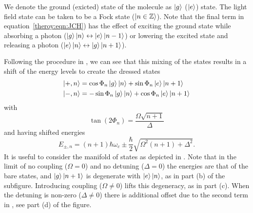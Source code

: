 We denote the ground (exicted) state of the molecule as $\ket{g}$ ($\ket{e}$)
state. The light field state can be taken to be a Fock state ($\ket{n \in
\mathbb{Z}}$). Note that the final term in equation~\ref{theroy:eqn:JCH}) has
the effect of exciting the ground state while absorbing a photon
($\ket{g}\ket{n} \leftrightarrow \ket{e}\ket{n-1}$) or lowering the excited state
and releasing a photon ($\ket{e}\ket{n} \leftrightarrow \ket{g}\ket{n+1}$).

Following the procedure in , we can see that this
mixing of the states results in a shift of the energy levels to create the
dressed states
%
\begin{align}
  \ket{+, n} &= \cos\Phi_n \ket{g}\ket{n} + \sin\Phi_n \ket{e}\ket{n+1} \\
  \ket{-, n} &= -\sin\Phi_n \ket{g}\ket{n} + \cos\Phi_n \ket{e}\ket{n+1}
\end{align}
%
with
%
\begin{equation}
  \tan(2\Phi_n) = \frac{\Omega\sqrt{n+1}}{\Delta}
\end{equation}
%
and having shifted energies
%
\begin{equation}
  E_{\pm, n} = (n+1)\hbar\omega_c \pm \frac{\hbar}{2}\sqrt{\Omega^2(n+1) +
  \Delta^2}.
  \label{theory:eqn:JCHenergies}
\end{equation}
%
It is useful to consider the manifold of states as depicted in
.  Note that in the limit of no coupling
($\Omega = 0$) and no detuning ($\Delta = 0$) the energies are that of the bare
states, and $\ket{g}\ket{n+1}$ is degenerate with $\ket{e}\ket{n}$, as in part
(b) of the subfigure. Introducing coupling ($\Omega \neq 0$) lifts this
degeneracy, as in part (c). When the detuning is non-zero ($\Delta \neq 0$)
there is additional offset due to the second term in
, see part (d) of the figure.



